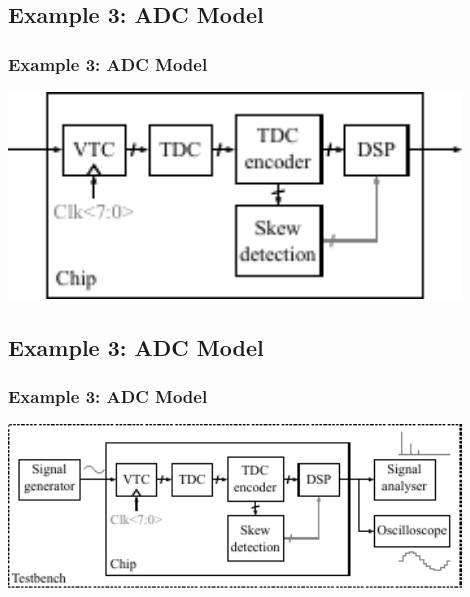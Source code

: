 \documentclass{sdkslides}
\begin{document}

\renewcommand{\sectionname}{Example 3: ADC Model}
\subsection*{\sectionname} 
\begin{frame}[c]
    \frametitle{\sectionname}
    \begin{center}
        \includegraphics[width=0.9\textwidth]{Pics/sdk_model_0}
    \end{center}
\end{frame}

\renewcommand{\sectionname}{Example 3: ADC Model}
\subsection*{\sectionname} 
\begin{frame}[c]
    \frametitle{\sectionname}
    \begin{center}
        \includegraphics[width=0.9\textwidth]{Pics/sdk_model_1}
    \end{center}
\end{frame}

\renewcommand{\sectionname}{Example 3: ADC Model}
\end{document}
